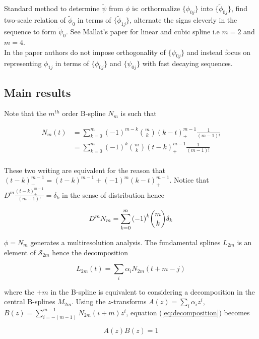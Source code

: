 \documentclass[a4paper, 11pt]{article}
\begin{document}
Standard method to determine $\tilde{\psi}$ from $\phi$ is: orthormalize $\{\phi_{0j}\}$ into $\{\tilde{\phi}_{0j}\}$, 
find two-scale relation of $\tilde{\phi}_0$ in terms of $\{\tilde{\phi}_{1j}\}$, alternate the signs cleverly in the 
sequence to form $\tilde{\psi}_{0}$. See Mallat's paper for linear and cubic spline i.e $m=2$ and $m=4$. \\

In the paper authors do not impose orthogonality of $\{\psi_{0j}\}$ and instead focus on representing $\phi_{1j}$ in 
terms of $\{\phi_{0j}\}$ and $\{\psi_{0j}\}$ with fast decaying sequences. 

\subsection{Main results}

Note that the $m^{th}$ order B-spline $N_m$ is such that 

\begin{align}
  N_m(t) & = \sum_{k=0}^m {(-1)}^{m-k} \binom{m}{k} {(k-t)}_+^{m-1} \frac{1}{(m-1)!} \\
  &= \sum_{k=0}^m {(-1)}^{k} \binom{m}{k} {(t-k)}_+^{m-1} \frac{1}{(m-1)!} \\
\end{align}

These two writing are equivalent for the reason that ${(t-k)}_+^{m-1} = {(t-k)}^{m-1} + {(-1)}^m {(k-t)}_+^{m-1}$.  
Notice that $D^m \frac{{(t-k)}_+^{m-1}}{(m-1)!} = \delta_k$ in the sense of distribution hence 

\begin{equation*}
  D^m N_m = \sum_{k=0}^m {(-1)}^{k} \binom{m}{k} \delta_k \\
\end{equation*}

$\phi = N_m$ generates a multiresolution analysis. The fundamental splines $L_{2m}$ is an element of $\mathcal{S}_{2m}$ 
hence the decomposition

\begin{equation}\label{eq:decomposition}
  L_{2m}(t) = \sum_{i} \alpha_i N_{2m}(t+m-j)
\end{equation}

where the $+m$ in the B-spline is equivalent to considering a decomposition in the central B-splines $M_{2m}$. Using the 
$z$-transforms $A(z) = \sum_i \alpha_i z^i$, $B(z) = \sum_{i=-(m-1)}^{m-1} N_{2m}(i+m)z^i$, equation 
(\ref{eq:decomposition}) becomes

\begin{equation}
  A(z) B(z) =1
\end{equation}
\end{document}
